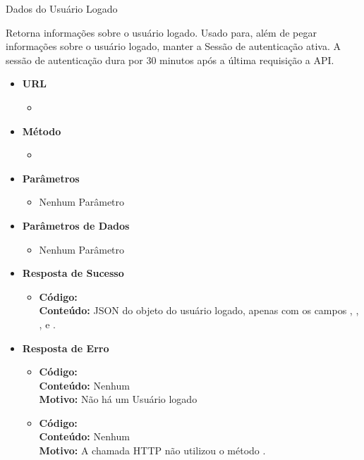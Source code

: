 
\begin{caixa}{Dados do Usuário Logado}{}

Retorna informações sobre o usuário logado. Usado para, além de pegar informações sobre o usuário logado, manter a Sessão de autenticação ativa. A sessão de autenticação dura por 30 minutos após a última requisição a API.

\begin{itemize}
\item \textbf{URL}
	\begin{itemize}
		\item {}
	\end{itemize}

\item \textbf{Método}
	\begin{itemize}
		\item {}
	\end{itemize}

\item \textbf{Parâmetros}
	\begin{itemize}
		\item Nenhum Parâmetro
	\end{itemize}

\item \textbf{Parâmetros de Dados}
	\begin{itemize}
		\item Nenhum Parâmetro
	\end{itemize}

\item \textbf{Resposta de Sucesso}
	\begin{itemize}
		\item \textbf{Código:}  \\ \textbf{Conteúdo:} JSON do objeto  do usuário logado, apenas com os campos , , ,  e .
	\end{itemize}

\item \textbf{Resposta de Erro}
	\begin{itemize}
		\item \textbf{Código:}  \\ \textbf{Conteúdo:} Nenhum \\ \textbf{Motivo:} Não há um Usuário logado
        \item \textbf{Código:}  \\ \textbf{Conteúdo:} Nenhum \\ \textbf{Motivo:} A chamada HTTP não utilizou o método .
	\end{itemize}

\end{itemize}
\end{caixa}


